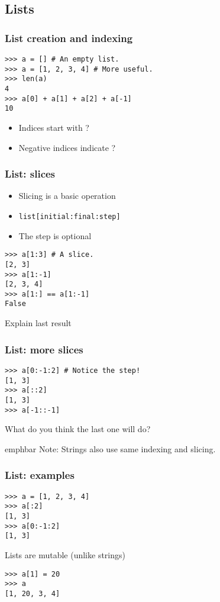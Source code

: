 \documentclass[14pt,compress]{beamer}
\newcommand{\emphbar}[1]
{\begin{beamercolorbox}[rounded=true]{emphbar} 
      {#1}
 \end{beamercolorbox}
}
\newcommand{\typ}[1]{\texttt{#1}}
\begin{document}
\subsection{Lists}

\begin{frame}[fragile]
  \frametitle{List creation and indexing}
\begin{lstlisting}
>>> a = [] # An empty list.
>>> a = [1, 2, 3, 4] # More useful.
>>> len(a) 
4
>>> a[0] + a[1] + a[2] + a[-1]
10
\end{lstlisting}
  \begin{itemize}
  \item Indices start with ?
  \item Negative indices indicate ?
  \end{itemize}
\end{frame}

\begin{frame}[fragile]
  \frametitle{List: slices}
  \begin{itemize}
  \item Slicing is a basic operation
  \item \typ{list[initial:final:step]}
  \item  The step is optional
  \end{itemize}
\begin{lstlisting}
>>> a[1:3] # A slice.
[2, 3]
>>> a[1:-1]
[2, 3, 4]
>>> a[1:] == a[1:-1]
False  
\end{lstlisting}
Explain last result
\end{frame}

\begin{frame}[fragile]
  \frametitle{List: more slices}
\begin{lstlisting}
>>> a[0:-1:2] # Notice the step!
[1, 3]
>>> a[::2]
[1, 3]
>>> a[-1::-1]
\end{lstlisting}
What do you think the last one will do?
  \emphbar{Note: Strings also use same indexing and slicing.}
\end{frame}

\begin{frame}[fragile]
  \frametitle{List: examples}
\begin{lstlisting}
>>> a = [1, 2, 3, 4]
>>> a[:2]
[1, 3]
>>> a[0:-1:2]
[1, 3]
\end{lstlisting}
\pause
\alert{Lists are mutable (unlike strings)}
\begin{lstlisting}
>>> a[1] = 20
>>> a
[1, 20, 3, 4]
\end{lstlisting}
\end{frame}
\end{document}
